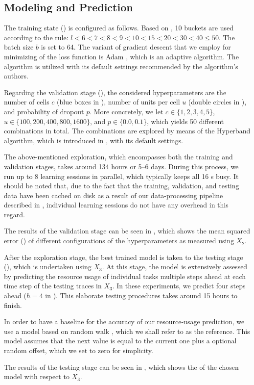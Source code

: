 \subsection{Modeling and Prediction}
The training state () is configured as follows. Based on
, 10 buckets are used according to the rule: $l < 6 < 7 < 8 < 9 <
10 < 15 < 20 < 30 < 40 \leq 50$. The batch size $b$ is set to 64. The variant of
gradient descent that we employ for minimizing of the loss function is Adam
\cite{kingma2014}, which is an adaptive algorithm. The algorithm is utilized
with its default settings recommended by the algorithm's authors.

Regarding the validation stage (), the considered
hyperparameters are the number of cells $c$ (blue boxes in ), number
of units per cell $u$ (double circles in ), and probability of
dropout $p$. More concretely, we let $c \in \{1, 2, 3, 4, 5\}$, $u \in \{100,
200, 400, 800, 1600\}$, and $p \in \{0.0, 0.1\}$, which yields 50 different
combinations in total. The combinations are explored by means of the Hyperband
algorithm, which is introduced in , with its default settings.

The above-mentioned exploration, which encompasses both the training and
validation stages, takes around 134 hours or 5--6 days. During this process, we
run up to 8 learning sessions in parallel, which typically keeps all 16
s busy. It should be noted that, due to the fact that the training,
validation, and testing data have been cached on disk as a result of our
data-processing pipeline described in , individual learning sessions
do not have any overhead in this regard.


The results of the validation stage can be seen in , which
shows the mean squared error () of different configurations of the
hyperparameters as measured using $X_2$.

After the exploration stage, the best trained model is taken to the testing
stage (), which is undertaken using $X_3$. At this stage, the
model is extensively assessed by predicting the resource usage of individual
tasks multiple steps ahead at each time step of the testing traces in $X_3$.
In these experiments, we predict four steps ahead ($h = 4$ in ).
This elaborate testing procedures takes around 15 hours to finish.

In order to have a baseline for the accuracy of our resource-usage prediction,
we use a model based on random walk \cite{hastie2009}, which we shall refer to
as the reference. This model assumes that the next value is equal to the current
one plus a optional random offset, which we set to zero for simplicity.


The results of the testing stage can be seen in , which shows the
 of the chosen model with respect to $X_3$.
